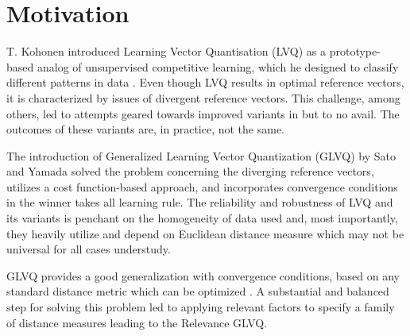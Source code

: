 \section{Motivation}
T. Kohonen introduced Learning Vector Quantisation (LVQ) as a prototype-based analog of unsupervised competitive learning, which he designed to classify different patterns in data \cite{kohonen2001learning}. Even though LVQ results in optimal reference vectors, it is characterized by issues of divergent reference vectors\cite{sato1996generalized}. This challenge, among others, led to attempts geared towards improved variants in \cite{kohonen2001learning} but to no avail. The outcomes of these variants are, in practice, not the same\cite{biehl2006learning}.


The introduction of Generalized Learning Vector Quantization (GLVQ) by Sato and Yamada solved the problem concerning the diverging reference vectors, utilizes a cost function-based approach, and incorporates convergence conditions in the winner takes all learning rule\cite{sato1996generalized}. The reliability and robustness of LVQ and its variants is penchant on the homogeneity of data used and, most importantly, they heavily utilize and depend on Euclidean distance measure which may not be universal for all cases understudy\cite{article}.

GLVQ provides a good generalization with convergence conditions, based on any standard distance metric which can be optimized \cite{hammer2005generalization}. A substantial and balanced step for solving this problem led to applying relevant factors to specify a family of distance measures leading to the  Relevance GLVQ\cite{hammer2002generalized}.

